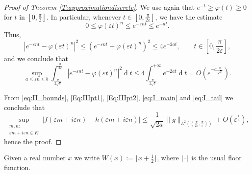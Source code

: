 \documentclass[12pt,a4paper,reqno]{amsart}
\theoremstyle{definition}
\theoremstyle{definition}\newtheorem{defn}[thm]{Definition}
\begin{document}
\begin{proof}[Proof of Theorem \ref{T:approximationdiscrete}]
    We use again that 
    \(
    e^{-t}\geqslant \varphi(t)\geqslant 0
    \)
    for $t$ in $[0,\frac\pi2]$.  
    In particular, whenever $t\in[0,\frac{\pi}{2\varepsilon}]$, %
    we have the estimate %
    \[
    0\leqslant \varphi(\varepsilon t)^n
    \leqslant e^{-\varepsilon nt}
    \leqslant e^{-at}.
    \]
    Thus,
    \[
    |
    e^{-\varepsilon nt}
    -
    \varphi(\varepsilon t)^n
    |^2
    \leqslant
    (e^{-\varepsilon nt}
    +
    \varphi(\varepsilon t)^n)^2
    \leqslant
    4e^{-2at},\qquad t\in[0,\frac{\pi}{2\varepsilon}],
    \]
    and we conclude that
    \begin{equation}\label{eq:I_tail}
    \sup_{a\leqslant \varepsilon n\leqslant b}\int_{\frac{\pi}{2\sqrt\varepsilon}}^{\frac{\pi}{2\varepsilon}}
    |e^{-\varepsilon nt}
    -\varphi(\varepsilon t)^n
    |^2
    \operatorname{d}\!t
    \leqslant
    4\int_{\frac{\pi}{2\sqrt\varepsilon}}^{+\infty}e^{-2at}\operatorname{d}\!t =O(e^{-a\frac{\pi}{\sqrt\varepsilon}}).
    \end{equation}
    
    From \eqref{eq:II_bounds}, \eqref{Eq:IIIpt1}, \eqref{Eq:IIIpt2}, \eqref{eq:I_main} and \eqref{eq:I_tail} we conclude that
    \[
    \sup_{\substack{m,n:\\
    \varepsilon m+i\varepsilon n\in K}}|f(\varepsilon m+i\varepsilon n)-h(\varepsilon m+i\varepsilon n)|\leqslant \frac{1}{\sqrt{2a}}\|g\|_{L^2((\frac{\pi}{2\varepsilon},\frac{\pi}{\varepsilon}))}+O(\varepsilon^{\frac{1}{4}}),
    \]
    hence the proof.
    \end{proof}
    
    Given a real number $x$ we write $W(x):=\lfloor x+\frac 12\rfloor$, where $\lfloor\cdot\rfloor$ is the usual floor function.
    
\end{document}
